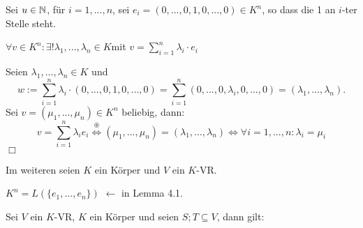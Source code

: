
\begin{nota}
	Sei $u\in\mathbb{N}$, für $i=1,...,n$, sei $e_{i}=(0,...,0,1,0,...,0)\in K^{n}$, so dass die 1 an $i$-ter Stelle steht.
\end{nota}

\begin{lem}
	$\forall v\in K^{n}:\exists!\lambda_{1},...,\lambda_{n}\in K$mit $v= \sum\limits_{i=1}^{n} \lambda_{i}\cdot e_{i}$
\end{lem}

\begin{bew}
	Seien $\lambda_{1},...,\lambda_{n}\in K$ und
	\[w:=\sum\limits_{i=1}^{n}\lambda_{i}\cdot(0,...,0,1,0,...,0)=\sum\limits_{i=1}^{n}(0,...,0,\lambda_{i},0,...,0)=(\lambda_{1},...,\lambda_{n}).\]
	Sei $v=(\mu_{1},...,\mu_{n})\in K^{n}$ beliebig, dann: \[v=\sum\limits_{i=1}^{n}\lambda_{i}e_{i}\stackrel{\circledast}{\Leftrightarrow}(\mu_{1},...,\mu_{n})=(\lambda_{1},...,\lambda_{n})\Leftrightarrow \forall i=1,...,n: \lambda_{i}=\mu_{i}\] \hfill $\Box$
\end{bew}
\noindent Im weiteren seien $K$ ein Körper und $V$ ein $K$-VR.
\begin{defi}
\end{defi}

\begin{bsp}
	$K^{n}=L(\{e_{1},...,e_{n}\})$ $\leftarrow$ in Lemma 4.1.
\end{bsp}

\begin{lem}
	Sei $V$ ein $K$-VR, $K$ ein Körper und seien $S;T\subseteq V$, dann gilt:
\end{lem}


